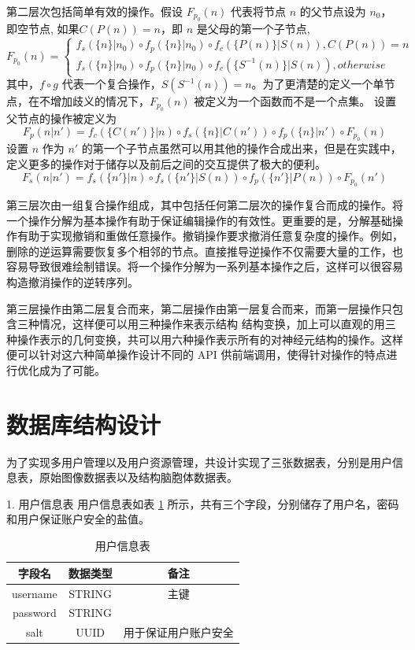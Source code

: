 第二层次包括简单有效的操作。假设 $F_{p_0}(n)$ 代表将节点 $n$ 的父节点设为 $n_0$， 即空节点, 如果$C(P(n)) = n$，即 $n$ 是父母的第一个子节点,
$$
F_{p_0}(n) =
\left\{
\begin{aligned}
f_s(\{n\} | n_0) \circ f_p(\{n\} | n_0) \circ f_c(\{P(n)\} | S(n)), C(P(n)) = n\\
f_s(\{n\} | n_0) \circ f_p(\{n\} | n_0) \circ f_c(\{S^{-1}(n)\} | S(n)), otherwise
\end{aligned}
\right.
$$
其中，$f \circ g$ 代表一个复合操作，$S(S^{-1}(n)) = n$。为了更清楚的定义一个单节点，在不增加歧义的情况下，$F_{p_0}(n)$ 被定义为一个函数而不是一个点集。
设置父节点的操作被定义为
$$F_p(n|n') = f_c(\{C(n')\}|n) \circ f_s(\{n\}|C(n'))  \circ f_p(\{n\}|n') \circ F_{p_0}(n)$$
设置 $n$ 作为 $n'$ 的第一个子节点虽然可以用其他的操作合成出来，但是在实践中，定义更多的操作对于储存以及前后之间的交互提供了极大的便利。
$$F_s(n|n') = f_s(\{n'\}|n) \circ f_s(\{n'\}|S(n))  \circ f_p(\{n'\}|P(n)) \circ F_{p_0}(n')$$

第三层次由一组复合操作组成，其中包括任何第二层次的操作复合而成的操作。将一个操作分解为基本操作有助于保证编辑操作的有效性。更重要的是，分解基础操作有助于实现撤销和重做任意操作。撤销操作要求撤消任意复杂度的操作。例如，删除的逆运算需要恢复多个相邻的节点。直接推导逆操作不仅需要大量的工作，也容易导致很难绘制错误。将一个操作分解为一系列基本操作之后，这样可以很容易构造撤消操作的逆转序列。

第三层操作由第二层复合而来，第二层操作由第一层复合而来，而第一层操作只包含三种情况，这样便可以用三种操作来表示结构
结构变换，加上可以直观的用三种操作表示的几何变换，共可以用六种操作表示所有的对神经元结构的操作。这样便可以针对这六种简单操作设计不同的 API 供前端调用，使得针对操作的特点进行优化成为了可能。

\section{数据库结构设计}
为了实现多用户管理以及用户资源管理，共设计实现了三张数据表，分别是用户信息表，原始图像数据表以及结构脑胞体数据表。

1. 用户信息表
用户信息表如表 \ref{user-table} 所示，共有三个字段，分别储存了用户名，密码和用户保证账户安全的盐值。
\begin{table}
\centering
\caption{用户信息表}
\begin{tabular}{|c|c|c|}
			   \hline
                 字段名 & 数据类型 & 备注 \\
               \hline
                 username & STRING & 主键 \\
               \hline
                 password & STRING &  \\
               \hline
                 salt & UUID & 用于保证用户账户安全 \\
               \hline
             \end{tabular}
             \label{user-table}    
\end{table}

